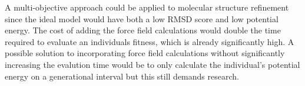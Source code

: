 \documentclass[conference]{IEEEtran}
\begin{document}
A multi-objective approach could be applied to molecular structure refinement since the ideal model would have both a low RMSD score and low potential energy. The cost of adding the force field calculations would double the time required to evaluate an individuals fitness, which is already significantly high. A possible solution to incorporating force field calculations without significantly increasing the evalution time would be to only calculate the individual's potential energy on a generational interval but this still demands research.



\end{document}
